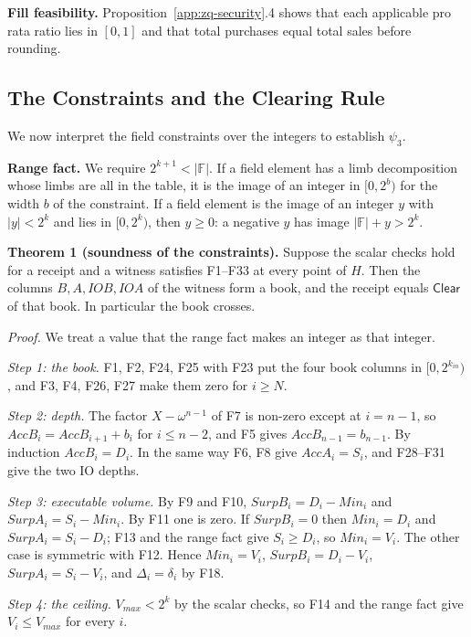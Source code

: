 \textbf{Fill feasibility.} Proposition~\ref{app:zq-security}.4 shows that each applicable pro rata ratio lies in \([0,1]\) and that total purchases equal total sales before rounding.

\subsection{The Constraints and the Clearing Rule}
\label{app:zq-constraint-proof}

We now interpret the field constraints over the integers to establish \(\psi_3\).

\textbf{Range fact.} We require \(2^{k+1} < |\mathbb{F}|\). If a field element has a limb decomposition whose limbs are all in the table, it is the image of an integer in \([0, 2^b)\) for the width \(b\) of the constraint. If a field element is the image of an integer \(y\) with \(|y| < 2^k\) and lies in \([0, 2^k)\), then \(y \ge 0\): a negative \(y\) has image \(|\mathbb{F}| + y > 2^k\).

\textbf{Theorem 1 (soundness of the constraints).} Suppose the scalar checks hold for a receipt and a witness satisfies F1--F33 at every point of \(H\). Then the columns \(B, A, IOB, IOA\) of the witness form a book, and the receipt equals \(\mathsf{Clear}\) of that book. In particular the book crosses.

\emph{Proof.} We treat a value that the range fact makes an integer as that integer.

\emph{Step 1: the book.} F1, F2, F24, F25 with F23 put the four book columns in \([0, 2^{k_{in}})\), and F3, F4, F26, F27 make them zero for \(i \ge N\).

\emph{Step 2: depth.} The factor \(X - \omega^{n-1}\) of F7 is non-zero except at \(i = n-1\), so \(AccB_i = AccB_{i+1} + b_i\) for \(i \le n-2\), and F5 gives \(AccB_{n-1} = b_{n-1}\). By induction \(AccB_i = D_i\). In the same way F6, F8 give \(AccA_i = S_i\), and F28--F31 give the two IO depths.

\emph{Step 3: executable volume.} By F9 and F10, \(SurpB_i = D_i - Min_i\) and \(SurpA_i = S_i - Min_i\). By F11 one is zero. If \(SurpB_i = 0\) then \(Min_i = D_i\) and \(SurpA_i = S_i - D_i\); F13 and the range fact give \(S_i \ge D_i\), so \(Min_i = V_i\). The other case is symmetric with F12. Hence \(Min_i = V_i\), \(SurpB_i = D_i - V_i\), \(SurpA_i = S_i - V_i\), and \(\Delta_i = \delta_i\) by F18.

\emph{Step 4: the ceiling.} \(V_{max} < 2^k\) by the scalar checks, so F14 and the range fact give \(V_i \le V_{max}\) for every \(i\).

